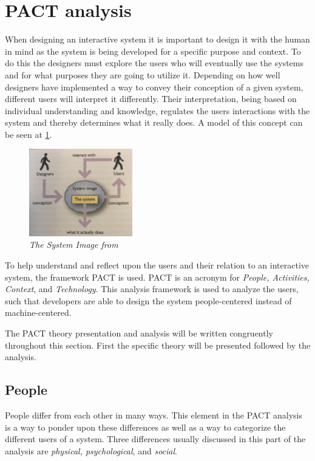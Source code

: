 
\section{PACT analysis}\label{sec:PACT}
When designing an interactive system it is important to design it with the human in mind as the system is being developed for a specific purpose and context.
To do this the designers must explore the users who will eventually use the systems and for what purposes they are going to utilize it.
Depending on how well designers have implemented a way to convey their conception of a given system, different users will interpret it differently.
Their interpretation, being based on individual understanding and knowledge, regulates the users interactions with the system and thereby determines what it really does.
\citep{Benyon}
A model of this concept can be seen at \cref{fig:PACT-SystemImage}.

\begin{figure}[H]
	\centering
	\includegraphics[width=0.4\textwidth]{billeder/SystemImage-Benyon.png}
	\caption{\textit{The System Image from \citep[p.~31]{Benyon}}}
	\label{fig:PACT-SystemImage}
\end{figure}

To help understand and reflect upon the users and their relation to an interactive system, the framework PACT is used.
PACT is an acronym for \textit{People, Activities, Context}, and \textit{Technology}.
This analysis framework is used to analyze the users, such that developers are able to design the system people-centered instead of machine-centered.
\citep{Benyon}

The PACT theory presentation and analysis will be written congruently throughout this section. First the specific theory will be presented followed by the analysis.

\subsection{People}\label{PACT-people}
People differ from each other in many ways.
This element in the PACT analysis is a way to ponder upon these differences as well as a way to categorize the different users of a system.
Three differences usually discussed in this part of the analysis are \textit{physical, psychological}, and \textit{social}. \citep{Benyon}

